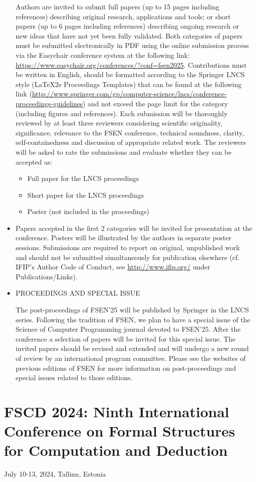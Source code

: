 \documentclass[prodmode,acmtecs]{acmsmall} %
\begin{document}
\begin{itemize}
  Authors are invited to submit full papers (up to 15 pages including references) describing original research, applications and tools; or short papers (up to 6 pages including references) describing ongoing research or new ideas that have not yet been fully validated. Both categories of papers must be submitted electronically in PDF using the online submission process via the Easychair conference system at the following link: \href{https://www.easychair.org/conferences/?conf=fsen2025}{https://www.easychair.org/conferences/?conf=fsen2025}. Contributions must be written in English, should be formatted according to the Springer LNCS style (LaTeX2e Proceedings Templates) that can be found at the following link (\href{http://www.springer.com/gp/computer-science/lncs/conference-proceedings-guidelines}{http://www.springer.com/gp/computer-science/lncs/conference-proceedings-guidelines}) and not exceed the page limit for the category (including figures and references). Each submission will be thoroughly reviewed by at least three reviewers considering scientific originality, significance, relevance to the FSEN conference, technical soundness, clarity, self-containedness and discussion of appropriate related work. The reviewers will be asked to rate the submissions and evaluate whether they can be accepted as: 
 
\begin{itemize}\item  Full paper for the LNCS proceedings
\item  Short paper for the LNCS proceedings
\item  Poster (not included in the proceedings)
\end{itemize} 
\item  Papers accepted in the first 2 categories will be invited for presentation at the conference. Posters will be illustrated by the authors in separate poster sessions. Submissions are required to report on original, unpublished work and should not be submitted simultaneously for publication elsewhere (cf. IFIP's Author Code of Conduct, see \href{http://www.ifip.org/}{http://www.ifip.org/} under Publications/Links). 
 
\item  PROCEEDINGS AND SPECIAL ISSUE  
 
  The post-proceedings of FSEN'25 will be published by Springer in the LNCS series. Following the tradition of FSEN, we plan to have a special issue of the Science of Computer Programming journal devoted to FSEN'25. After the conference a selection of papers will be invited for this special issue. The invited papers should be revised and extended and will undergo a new round of review by an international program committee. Please see the websites of previous editions of FSEN for more information on post-proceedings and special issues related to those editions. 
 
\end{itemize}\section{FSCD 2024: Ninth International Conference on Formal Structures for Computation and Deduction}\label{FSCD2024}  July 10-13, 2024, Tallinn, Estonia\\ 
\end{document}
